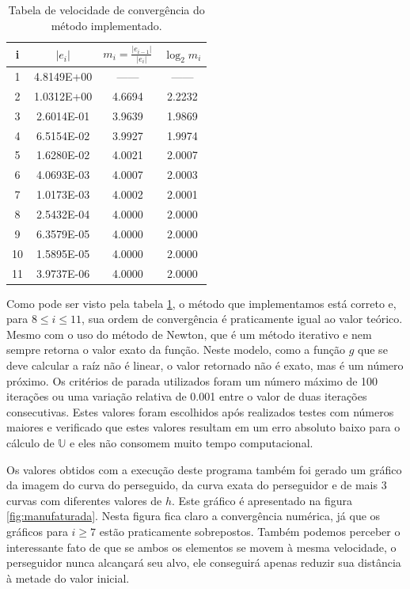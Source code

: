 \documentclass[a4paper,10pt]{article}
\begin{document}
  \begin{table}[ht]
    \begin{center}
      \begin{tabular}{|c || c c c|}
      \hline
      i &  $|e_{i}|$   & $m_{i} = \frac{|e_{i-1}|}{|e_{i}|}$ & $\log_{2}m_{i}$ \\
      \hline
      1 & 4.8149E+00 & ------ & ------ \\
      2 & 1.0312E+00 & 4.6694 & 2.2232 \\ 
      3 & 2.6014E-01 & 3.9639 & 1.9869 \\
      4 & 6.5154E-02 & 3.9927 & 1.9974 \\ 
      5 & 1.6280E-02 & 4.0021 & 2.0007 \\ 
      6 & 4.0693E-03 & 4.0007 & 2.0003 \\ 
      7 & 1.0173E-03 & 4.0002 & 2.0001 \\ 
      8 & 2.5432E-04 & 4.0000 & 2.0000 \\
      9 & 6.3579E-05 & 4.0000 & 2.0000 \\
      10 & 1.5895E-05 & 4.0000 & 2.0000 \\
      11 & 3.9737E-06 & 4.0000 & 2.0000 \\
      \hline
      \end{tabular} 	
    \end{center}
    \label{tab:convergencia}
    \caption{Tabela de velocidade de convergência do método implementado.}
  \end{table}
  
  Como pode ser visto pela tabela \ref{tab:convergencia}, o método que implementamos está correto e, para $8 \leq i \leq 11$, sua ordem de convergência é praticamente igual ao valor teórico. Mesmo com o uso do método de Newton, que é um método iterativo e nem sempre retorna o valor exato da função. Neste modelo, como a função $g$ que se deve calcular a raíz não é linear, o valor retornado não é exato, mas é um número próximo. Os critérios de parada utilizados foram um número máximo de 100 iterações ou uma variação relativa de 0.001 entre o valor de duas iterações consecutivas. Estes valores foram escolhidos após realizados testes com números maiores e verificado que estes valores resultam em um erro absoluto baixo para o cálculo de $\mathbb{U}$ e eles não consomem muito tempo computacional.
  
  Os valores obtidos com a execução deste programa também foi gerado um gráfico da imagem do curva do perseguido, da curva exata do perseguidor e de mais 3 curvas com diferentes valores de $h$. Este gráfico é apresentado na figura \ref{fig:manufaturada}. Nesta figura fica claro a convergência numérica, já que os gráficos para $ i \geqslant 7$ estão praticamente sobrepostos. Também podemos perceber o interessante fato de que se ambos os elementos se movem à mesma velocidade, o perseguidor nunca alcançará seu alvo, ele conseguirá apenas reduzir sua distância à metade do valor inicial.
  
\end{document}
